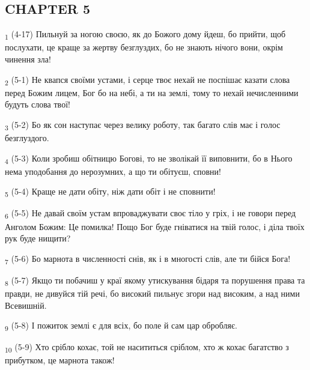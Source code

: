 \subsection{CHAPTER 5}
\begin{tcolorbox}
\textsubscript{1} (4-17) Пильнуй за ногою своєю, як до Божого дому йдеш, бо прийти, щоб послухати, це краще за жертву безглуздих, бо не знають нічого вони, окрім чинення зла!
\end{tcolorbox}
\begin{tcolorbox}
\textsubscript{2} (5-1) Не квапся своїми устами, і серце твоє нехай не поспішає казати слова перед Божим лицем, Бог бо на небі, а ти на землі, тому то нехай нечисленними будуть слова твої!
\end{tcolorbox}
\begin{tcolorbox}
\textsubscript{3} (5-2) Бо як сон наступає через велику роботу, так багато слів має і голос безглуздого.
\end{tcolorbox}
\begin{tcolorbox}
\textsubscript{4} (5-3) Коли зробиш обітницю Богові, то не зволікай її виповнити, бо в Нього нема уподобання до нерозумних, а що ти обітуєш, сповни!
\end{tcolorbox}
\begin{tcolorbox}
\textsubscript{5} (5-4) Краще не дати обіту, ніж дати обіт і не сповнити!
\end{tcolorbox}
\begin{tcolorbox}
\textsubscript{6} (5-5) Не давай своїм устам впроваджувати своє тіло у гріх, і не говори перед Анголом Божим: Це помилка! Пощо Бог буде гніватися на твій голос, і діла твоїх рук буде нищити?
\end{tcolorbox}
\begin{tcolorbox}
\textsubscript{7} (5-6) Бо марнота в численності снів, як і в многості слів, але ти бійся Бога!
\end{tcolorbox}
\begin{tcolorbox}
\textsubscript{8} (5-7) Якщо ти побачиш у краї якому утискування бідаря та порушення права та правди, не дивуйся тій речі, бо високий пильнує згори над високим, а над ними Всевишній.
\end{tcolorbox}
\begin{tcolorbox}
\textsubscript{9} (5-8) І пожиток землі є для всіх, бо поле й сам цар обробляє.
\end{tcolorbox}
\begin{tcolorbox}
\textsubscript{10} (5-9) Хто срібло кохає, той не насититься сріблом, хто ж кохає багатство з прибутком, це марнота також!
\end{tcolorbox}
